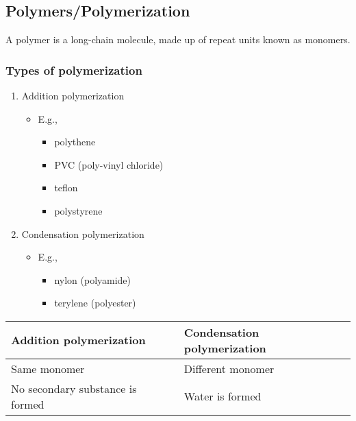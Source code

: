 \documentclass[11pt]{article}
\begin{document}
\subsection{Polymers/Polymerization}
\label{sec:org5af9d56}
A polymer is a long-chain molecule, made up of repeat units known as monomers.
\subsubsection{Types of polymerization}
\label{sec:org06c062f}
\begin{enumerate}
\item Addition polymerization
\begin{itemize}
\item E.g.,
\begin{itemize}
\item polythene
\item PVC (poly-vinyl chloride)
\item teflon
\item polystyrene
\end{itemize}
\end{itemize}
\item Condensation polymerization
\begin{itemize}
\item E.g.,
\begin{itemize}
\item nylon (polyamide)
\item terylene (polyester)
\end{itemize}
\end{itemize}
\end{enumerate}
\begin{center}
\begin{tabular}{ll}
Addition polymerization & Condensation polymerization\\
\hline
Same monomer & Different monomer\\
No secondary substance is formed & Water is formed\\
\end{tabular}
\end{center}
\end{document}
